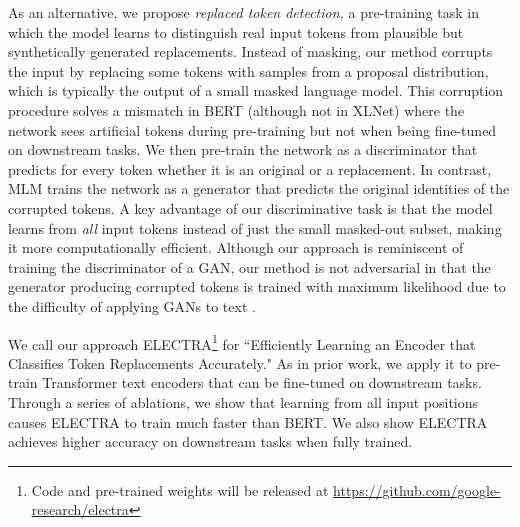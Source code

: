 \documentclass{article}
\begin{document}
As an alternative, we propose \emph{replaced token detection,} a pre-training task in which the model learns to distinguish real input tokens from plausible but synthetically generated replacements. 
Instead of masking, our method corrupts the input by replacing some tokens with samples from a proposal distribution, which is typically the output of a small masked language model.
This corruption procedure solves a mismatch in BERT (although not in XLNet) where the network sees artificial  tokens during pre-training but not when being fine-tuned on downstream tasks.
We then pre-train the network as a discriminator that predicts for every token whether it is an original or a replacement. 
In contrast, MLM trains the network as a generator that predicts the original identities of the corrupted tokens.
A key advantage of our discriminative task is that the model learns from \emph{all} input tokens instead of just the small masked-out subset, making it more computationally efficient.
Although our approach is reminiscent of training the discriminator of a GAN, our method is not adversarial in that the generator producing corrupted tokens is trained with maximum likelihood due to the difficulty of applying GANs to text \citep{Caccia2018LanguageGF}.

We call our approach ELECTRA\footnote{Code and pre-trained weights will be released at \url{https://github.com/google-research/electra}} for ``Efficiently Learning an Encoder that Classifies Token Replacements Accurately." 
As in prior work, we apply it to pre-train Transformer text encoders \citep{Vaswani2017AttentionIA} that can be fine-tuned on downstream tasks.
Through a series of ablations, we show that learning from all input positions causes ELECTRA to train much faster than BERT.
We also show ELECTRA achieves higher accuracy on downstream tasks when fully trained.  
\end{document}
